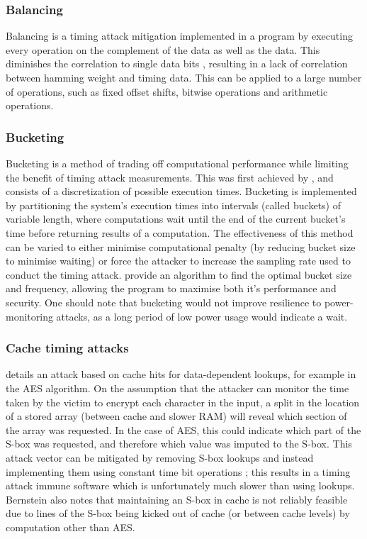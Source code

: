 \documentclass[british,10pt,a4paper]{article}
\begin{document}
\subsubsection{Balancing}
Balancing is a timing attack mitigation implemented in a program by executing every operation on the complement of the data as well as the data. This diminishes the correlation to single data bits \cite{daemen-implementattacks}, resulting in a lack of correlation between hamming weight and timing data. This can be applied to a large number of operations, such as fixed offset shifts, bitwise operations and arithmetic operations.
\subsubsection{Bucketing}
Bucketing is a method of trading off computational performance while limiting the benefit of timing attack measurements. This was first achieved by \citet{Kopf2009-mh}, and consists of a discretization of possible execution times.
Bucketing is implemented by partitioning the system's execution times into intervals (called buckets) of variable length, where computations wait until the end of the current bucket's time before returning results of a computation. The effectiveness of this method can be varied to either minimise computational penalty (by reducing bucket size to minimise waiting) or force the attacker to increase the sampling rate used to conduct the timing attack. \citeauthor{Kopf2009-mh} provide an algorithm to find the optimal bucket size and frequency, allowing the program to maximise both it's performance and security. One should note that bucketing would not improve resilience to power-monitoring attacks, as a long period of low power usage would indicate a wait.

\subsubsection{Cache timing attacks}
\citet{Bernstein05cache-timingattacks} details an attack based on cache hits for data-dependent lookups, for example in the AES algorithm. On the assumption that the attacker can monitor the time taken by the victim to encrypt each character in the input, a split in the location of a stored array (between cache and slower RAM) will reveal which section of the array was requested. In the case of AES, this could indicate which part of the S-box was requested, and therefore which value was imputed to the S-box. This attack vector can be mitigated by removing S-box lookups and instead implementing them using constant time bit operations \cite{Bernstein05cache-timingattacks}; this results in a timing attack immune software which is unfortunately much slower than using lookups.
Bernstein also notes that maintaining an S-box in cache is not reliably feasible due to lines of the S-box being kicked out of cache (or between cache levels) by computation other than AES. 
\end{document}
